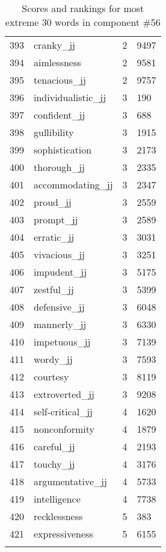 \begin{longtable}[!htbp]{| rlr@{.}l |}
    393 & cranky\_jj & 2 & 9497 \\
    394 & aimlessness & 2 & 9581 \\
    395 & tenacious\_jj & 2 & 9757 \\
    396 & individualistic\_jj & 3 & 190 \\
    397 & confident\_jj & 3 & 688 \\
    398 & gullibility & 3 & 1915 \\
    399 & sophistication & 3 & 2173 \\
    400 & thorough\_jj & 3 & 2335 \\
    401 & accommodating\_jj & 3 & 2347 \\
    402 & proud\_jj & 3 & 2559 \\
    403 & prompt\_jj & 3 & 2589 \\
    404 & erratic\_jj & 3 & 3031 \\
    405 & vivacious\_jj & 3 & 3251 \\
    406 & impudent\_jj & 3 & 5175 \\
    407 & zestful\_jj & 3 & 5399 \\
    408 & defensive\_jj & 3 & 6048 \\
    409 & mannerly\_jj & 3 & 6330 \\
    410 & impetuous\_jj & 3 & 7139 \\
    411 & wordy\_jj & 3 & 7593 \\
    412 & courtesy & 3 & 8119 \\
    413 & extroverted\_jj & 3 & 9208 \\
    414 & self-critical\_jj & 4 & 1620 \\
    415 & nonconformity & 4 & 1879 \\
    416 & careful\_jj & 4 & 2193 \\
    417 & touchy\_jj & 4 & 3176 \\
    418 & argumentative\_jj & 4 & 5733 \\
    419 & intelligence & 4 & 7738 \\
    420 & recklessness & 5 & 383 \\
    421 & expressiveness & 5 & 6155 \\
    \hline
    \caption{Scores and rankings for most extreme 30 words in component \#56} \\
\end{longtable}
